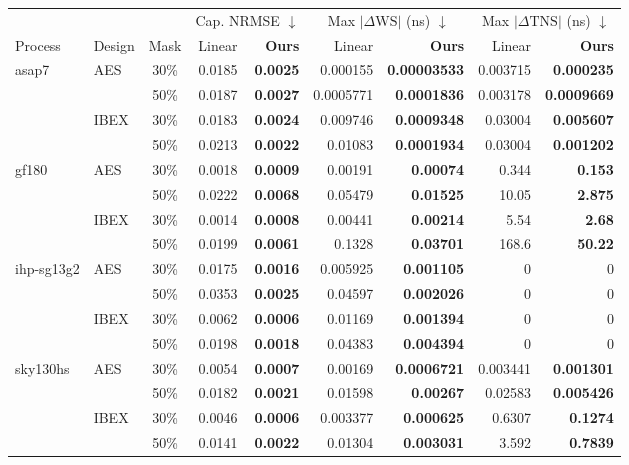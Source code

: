 \scriptsize
\setlength{\tabcolsep}{2.5pt}
\begin{tabular*}{\linewidth}{@{\extracolsep{\fill}}llcrrrrrr@{}}\toprule
 &  &  & \multicolumn{2}{c}{Cap. NRMSE $\downarrow$} & \multicolumn{2}{c}{Max $|\Delta\mathrm{WS}|$ (ns) $\downarrow$} & \multicolumn{2}{c}{Max $|\Delta\mathrm{TNS}|$ (ns) $\downarrow$} \\
\cmidrule(lr){4-5}\cmidrule(lr){6-7}\cmidrule(lr){8-9}
Process & Design & Mask & Linear & \textbf{Ours} & Linear & \textbf{Ours} & Linear & \textbf{Ours} \\
\midrule
asap7 & AES & 30\% & 0.0185 & \textbf{0.0025} & 0.000155 & \textbf{0.00003533} & 0.003715 & \textbf{0.000235} \\
 &  & 50\% & 0.0187 & \textbf{0.0027} & 0.0005771 & \textbf{0.0001836} & 0.003178 & \textbf{0.0009669} \\
 & IBEX & 30\% & 0.0183 & \textbf{0.0024} & 0.009746 & \textbf{0.0009348} & 0.03004 & \textbf{0.005607} \\
 &  & 50\% & 0.0213 & \textbf{0.0022} & 0.01083 & \textbf{0.0001934} & 0.03004 & \textbf{0.001202} \\
\midrule
gf180 & AES & 30\% & 0.0018 & \textbf{0.0009} & 0.00191 & \textbf{0.00074} & 0.344 & \textbf{0.153} \\
 &  & 50\% & 0.0222 & \textbf{0.0068} & 0.05479 & \textbf{0.01525} & 10.05 & \textbf{2.875} \\
 & IBEX & 30\% & 0.0014 & \textbf{0.0008} & 0.00441 & \textbf{0.00214} & 5.54 & \textbf{2.68} \\
 &  & 50\% & 0.0199 & \textbf{0.0061} & 0.1328 & \textbf{0.03701} & 168.6 & \textbf{50.22} \\
\midrule
ihp-sg13g2 & AES & 30\% & 0.0175 & \textbf{0.0016} & 0.005925 & \textbf{0.001105} & 0 & 0 \\
 &  & 50\% & 0.0353 & \textbf{0.0025} & 0.04597 & \textbf{0.002026} & 0 & 0 \\
 & IBEX & 30\% & 0.0062 & \textbf{0.0006} & 0.01169 & \textbf{0.001394} & 0 & 0 \\
 &  & 50\% & 0.0198 & \textbf{0.0018} & 0.04383 & \textbf{0.004394} & 0 & 0 \\
\midrule
sky130hs & AES & 30\% & 0.0054 & \textbf{0.0007} & 0.00169 & \textbf{0.0006721} & 0.003441 & \textbf{0.001301} \\
 &  & 50\% & 0.0182 & \textbf{0.0021} & 0.01598 & \textbf{0.00267} & 0.02583 & \textbf{0.005426} \\
 & IBEX & 30\% & 0.0046 & \textbf{0.0006} & 0.003377 & \textbf{0.000625} & 0.6307 & \textbf{0.1274} \\
 &  & 50\% & 0.0141 & \textbf{0.0022} & 0.01304 & \textbf{0.003031} & 3.592 & \textbf{0.7839} \\
\bottomrule\end{tabular*}
